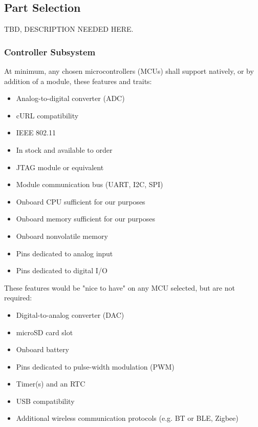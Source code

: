 \subsection{Part Selection}
TBD, DESCRIPTION NEEDED HERE.
\subsubsection{Controller Subsystem}
At minimum, any chosen microcontrollers (MCUs) shall support natively, or by addition of a
module, these features and traits:
\begin{itemize}
	\item Analog-to-digital converter (ADC)
	\item cURL compatibility
	\item IEEE 802.11
	\item In stock and available to order
	\item JTAG module or equivalent
	\item Module communication bus (UART, I2C, SPI)
	\item Onboard CPU sufficient for our purposes
	\item Onboard memory sufficient for our purposes
	\item Onboard nonvolatile memory
	\item Pins dedicated to analog input
	\item Pins dedicated to digital I/O
\end{itemize}
These features would be "nice to have" on any MCU selected, but are not required:
\begin{itemize}
	\item Digital-to-analog converter (DAC)
	\item microSD card slot
	\item Onboard battery
	\item Pins dedicated to pulse-width modulation (PWM)
	\item Timer(s) and an RTC
	\item USB compatibility
	\item Additional wireless communication protocols (e.g. BT or BLE, Zigbee)
\end{itemize}

